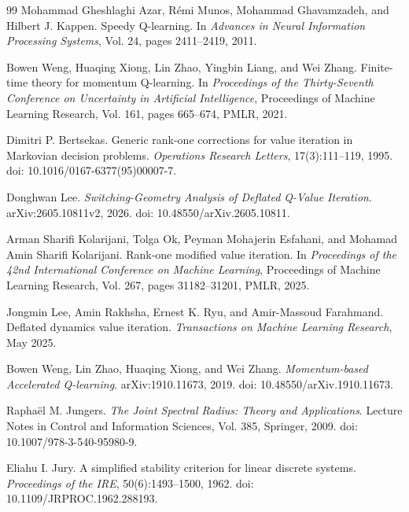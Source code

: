 \documentclass[letterpaper]{article}
\numberwithin{equation}{section}
\begin{document}
\begin{thebibliography}{99}
Mohammad Gheshlaghi Azar, R\'emi Munos, Mohammad Ghavamzadeh, and Hilbert J. Kappen.
\newblock Speedy Q-learning.
\newblock In \emph{Advances in Neural Information Processing Systems}, Vol. 24, pages 2411--2419, 2011.

Bowen Weng, Huaqing Xiong, Lin Zhao, Yingbin Liang, and Wei Zhang.
\newblock Finite-time theory for momentum Q-learning.
\newblock In \emph{Proceedings of the Thirty-Seventh Conference on Uncertainty in Artificial Intelligence}, Proceedings of Machine Learning Research, Vol. 161, pages 665--674, PMLR, 2021.

Dimitri P. Bertsekas.
\newblock Generic rank-one corrections for value iteration in Markovian decision problems.
\newblock \emph{Operations Research Letters}, 17(3):111--119, 1995.
\newblock doi: 10.1016/0167-6377(95)00007-7.

Donghwan Lee.
\newblock \emph{Switching-Geometry Analysis of Deflated Q-Value Iteration}.
\newblock arXiv:2605.10811v2, 2026.
\newblock doi: 10.48550/arXiv.2605.10811.

Arman Sharifi Kolarijani, Tolga Ok, Peyman Mohajerin Esfahani, and Mohamad Amin Sharifi Kolarijani.
\newblock Rank-one modified value iteration.
\newblock In \emph{Proceedings of the 42nd International Conference on Machine Learning}, Proceedings of Machine Learning Research, Vol. 267, pages 31182--31201, PMLR, 2025.

Jongmin Lee, Amin Rakhsha, Ernest K. Ryu, and Amir-Massoud Farahmand.
\newblock Deflated dynamics value iteration.
\newblock \emph{Transactions on Machine Learning Research}, May 2025.

Bowen Weng, Lin Zhao, Huaqing Xiong, and Wei Zhang.
\newblock \emph{Momentum-based Accelerated Q-learning}.
\newblock arXiv:1910.11673, 2019.
\newblock doi: 10.48550/arXiv.1910.11673.

Rapha\"el M. Jungers.
\newblock \emph{The Joint Spectral Radius: Theory and Applications}.
\newblock Lecture Notes in Control and Information Sciences, Vol. 385, Springer, 2009.
\newblock doi: 10.1007/978-3-540-95980-9.

Eliahu I. Jury.
\newblock A simplified stability criterion for linear discrete systems.
\newblock \emph{Proceedings of the IRE}, 50(6):1493--1500, 1962.
\newblock doi: 10.1109/JRPROC.1962.288193.


\end{thebibliography}
\end{document}
